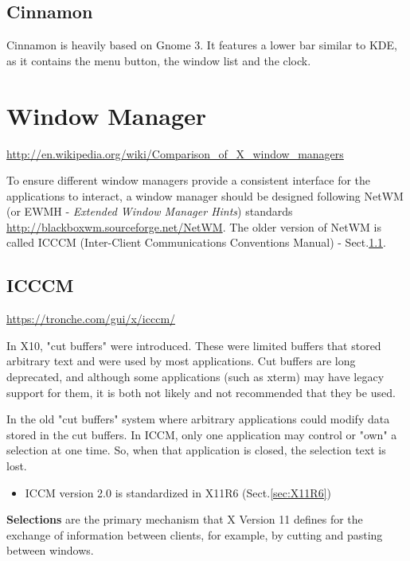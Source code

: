 \subsection{Cinnamon}
\label{sec:Cinnamon}

Cinnamon is heavily based on Gnome 3. It features a lower bar similar to KDE, as
it contains the menu button, the window list and the clock.




\section{Window Manager}
\label{sec:window_manager}

\url{http://en.wikipedia.org/wiki/Comparison_of_X_window_managers}

To ensure different window managers provide a consistent interface for the
applications to interact, a window manager should be designed following NetWM
(or EWMH - {\it Extended Window Manager Hints}) standards
\url{http://blackboxwm.sourceforge.net/NetWM}.
The older version of NetWM is called ICCCM (Inter-Client Communications
Conventions Manual) - Sect.\ref{sec:ICCCM}.

\subsection{ICCCM}
\label{sec:ICCCM}
\label{sec:selections}
\url{https://tronche.com/gui/x/icccm/}

\begin{mdframed}
In X10, "cut buffers" were introduced. These were limited buffers that stored
arbitrary text and were used by most applications.  Cut buffers are long
deprecated, and although some applications (such as xterm) may have legacy
support for them, it is both not likely and not recommended that they be used.  

In the old "cut buffers" system where arbitrary applications could modify data
stored in the cut buffers. In ICCM, only one application may control or "own" a
selection at one time. So, when that application is closed, the selection text
is lost.
\end{mdframed}

\begin{itemize}
  \item ICCM version 2.0  is standardized in X11R6 (Sect.\ref{sec:X11R6})
\end{itemize}

{\bf Selections} are the primary mechanism that X Version 11 defines for the
exchange of information between clients, for example, by cutting and pasting
between windows.

